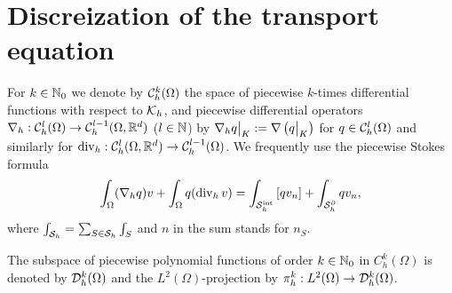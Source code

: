 %
\section{Discreization of the transport equation}\label{sec:}
%
For $k\in\mathbb N_0$ we denote by $\mathcal{C}_h^k(\Omega)$ the space of piecewise $k$-times differential functions with respect to $\mathcal K_h$, and 
piecewise differential operators $\nabla_h:\mathcal{C}_h^l(\Omega)\to \mathcal{C}_h^{l-1}(\Omega,\mathbb R^d)$ ($l\in\mathbb N$) by 
$\Rest{\nabla_h q}{K} := \nabla\left(\Rest{q}{K}\right)$ for $q\in \mathcal{C}_h^l(\Omega)$ and similarly for 
$\operatorname{div}_h: \mathcal{C}_h^{l}(\Omega,\mathbb R^d)\to \mathcal{C}_h^{l-1}(\Omega)$.
We frequently use the piecewise Stokes formula
%
\begin{equation}\label{eq:StokesPiecewise}
\int_{\Omega} (\nabla_h q) v + \int_{\Omega} q (\operatorname{div}_h v) = \int_{\mathcal S^{\rm int}_h}\left[q v_n\right] +  \int_{\mathcal S^{\partial}_h}q v_n,
\end{equation}
%
where $\int_{\mathcal S_h}=\sum_{S\in\mathcal S_h}\int_S$ and $n$ in the sum stands for $n_S$.

The subspace of piecewise polynomial functions of order $k\in\mathbb N_0$ in $C^k_h(\Omega)$ is denoted by $\mathcal{D}_h^k(\Omega)$ and the $L^2(\Omega)$-projection by $\pi_h^k:L^2(\Omega)\to\mathcal{D}_h^k(\Omega)$.


